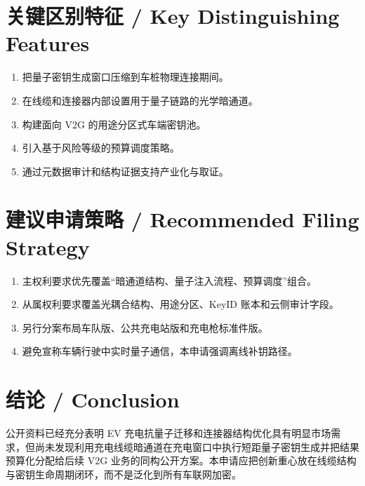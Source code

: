﻿\documentclass[12pt,a4paper]{article}
\begin{document}
\section{关键区别特征 / Key Distinguishing Features}
\begin{enumerate}
\item 把量子密钥生成窗口压缩到车桩物理连接期间。
\item 在线缆和连接器内部设置用于量子链路的光学暗通道。
\item 构建面向 V2G 的用途分区式车端密钥池。
\item 引入基于风险等级的预算调度策略。
\item 通过元数据审计和结构证据支持产业化与取证。
\end{enumerate}

\section{建议申请策略 / Recommended Filing Strategy}
\begin{enumerate}
\item 主权利要求优先覆盖“暗通道结构、量子注入流程、预算调度”组合。
\item 从属权利要求覆盖光耦合结构、用途分区、KeyID 账本和云侧审计字段。
\item 另行分案布局车队版、公共充电站版和充电枪标准件版。
\item 避免宣称车辆行驶中实时量子通信，本申请强调离线补钥路径。
\end{enumerate}

\section{结论 / Conclusion}
公开资料已经充分表明 EV 充电抗量子迁移和连接器结构优化具有明显市场需求，但尚未发现利用充电线缆暗通道在充电窗口中执行短距量子密钥生成并把结果预算化分配给后续 V2G 业务的同构公开方案。本申请应把创新重心放在线缆结构与密钥生命周期闭环，而不是泛化到所有车联网加密。
\end{document}
